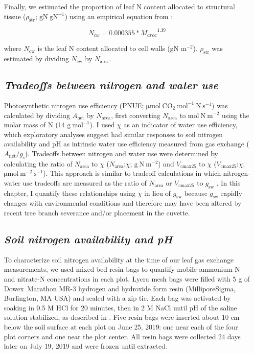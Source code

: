 Finally, we estimated the proportion of leaf N content allocated to structural tissue ($\rho_\mathrm{str}$; $\mathrm{gN\ gN^{-1}}$) using an empirical equation from :

\begin{equation} \label{eqn_2.14}
    N_{cw}=0.000355*{M_{area}}^{1.39}
\end{equation}
    
\noindent where $N_\mathrm{cw}$ is the leaf N content allocated to cell walls (gN m$^{-2}$). $\rho_\mathrm{str}$ was estimated by dividing $N_\mathrm{cw}$ by $N_\mathrm{area}$.

\subsection{\textit{Tradeoffs between nitrogen and water use}}
Photosynthetic nitrogen use efficiency (PNUE; $\mathrm{\mu mol\ CO_2\ mol^{-1}\ N\ s^{-1}}$) was calculated by dividing $A_\mathrm{net}$ by $N_\mathrm{area}$, first converting $N_\mathrm{area}$ to $\mathrm{mol\ N\ m^{-2}}$ using the molar mass of N (14 $\mathrm{g\ mol^{-1}}$). I used $\chi$ as an indicator of water use efficiency, which exploratory analyses suggest had similar responses to soil nitrogen availability and pH as intrinsic water use efficiency measured from gas exchange ($A_\mathrm{net}$/$g_\mathrm{s}$). Tradeoffs between nitrogen and water use were determined by calculating the ratio of $N_\mathrm{area}$ to $\chi$ ($N_\mathrm{area}$:$\chi$; $\mathrm{g\ N\ m^{-2}}$) and $V_\mathrm{cmax25}$ to $\chi$ ($V_\mathrm{cmax25}$:$\chi$; $\mathrm{\mu mol\ m^{-2}\ s^{-1}}$). This approach is similar to tradeoff calculations in which nitrogen-water use tradeoffs are measured as the ratio of $N_\mathrm{area}$ or $V_\mathrm{cmax25}$ to $g_\mathrm{sw}$ . In this chapter, I quantify these relationships using $\chi$ in lieu of $g_\mathrm{sw}$ because $g_\mathrm{sw}$ rapidly changes with environmental conditions and therefore may have been altered by recent tree branch severance and/or placement in the cuvette.

\subsection{\textit{Soil nitrogen availability and pH}}
To characterize soil nitrogen availability at the time of our leaf gas exchange measurements, we used mixed bed resin bags to quantify mobile ammonium-N and nitrate-N concentrations in each plot. Lycra mesh bags were filled with 5 g of Dowex\textregistered\ Marathon MR-3 hydrogen and hydroxide form resin (MilliporeSigma, Burlington, MA USA) and sealed with a zip tie. Each bag was activated by soaking in 0.5 M HCl for 20 minutes, then in 2 M NaCl until pH of the saline solution stabilized, as described in . Five resin bags were inserted about 10 cm below the soil surface at each plot on June 25, 2019: one near each of the four plot corners and one near the plot center. All resin bags were collected 24 days later on July 19, 2019 and were frozen until extracted.
    
